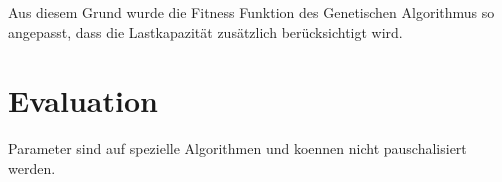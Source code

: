 Aus diesem Grund wurde die Fitness Funktion des Genetischen Algorithmus so angepasst, dass die Lastkapazität zusätzlich berücksichtigt wird.

\section{Evaluation}
\label{sec:evalutation_verification}



Parameter sind auf spezielle Algorithmen und koennen nicht pauschalisiert werden.